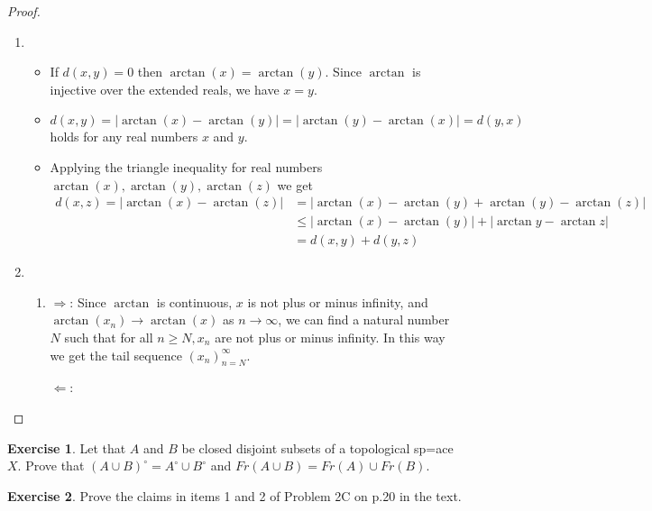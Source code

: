 \documentclass[12pt]{extarticle}
\newcommand{\abs}[1]{|#1|}
\newcommand{\<}{\langle}
\renewcommand{\>}{\rangle}
\theoremstyle{definition}
\newtheorem{exercise}{Exercise}
\begin{document}
\begin{proof}
  \begin{enumerate}
  \item
    \begin{itemize}
    \item
      If $d(x,y)=0$ then $\arctan(x) = \arctan(y)$. Since $\arctan$ is injective over the extended reals, we have $x=y$.
    \item
      $d(x,y) = \abs{\arctan(x) - \arctan(y)} = \abs{\arctan(y) - \arctan(x)} = d(y,x)$ holds for any real numbers $x$ and $y$.
    \item
      Applying the triangle inequality for real numbers $\arctan(x),\arctan(y),\arctan(z)$ we get
      \begin{align*}
        d(x,z) = \abs{\arctan(x) - \arctan(z)}
        &= \abs{\arctan(x) - \arctan(y) + \arctan(y) - \arctan(z)} \\
        &\leq  \abs{ \arctan(x) - \arctan(y)} + \abs{ \arctan{y} - \arctan{z}} \\
        &= d(x,y) + d(y,z)
      \end{align*}
    \end{itemize}
  \item
    \begin{enumerate}
    \item
      $\Rightarrow$: 
      Since $\arctan$ is continuous, $x$ is not plus or minus infinity, and $\arctan(x_n) \to \arctan(x)$ as $n \to \infty$, we can find a natural number $N$ such that for all $n \geq N, x_n$ are not plus or minus infinity. In this way we get the tail sequence $(x_n)_{n=N}^{\infty}$.   
      
      $\Leftarrow$: 

    \end{enumerate}


  \end{enumerate}
\end{proof}
\begin{exercise}
  Let that $A$ and $B$ be closed disjoint subsets of a topological sp=ace $X$. Prove that
  $(A \cup B)^\circ = A^\circ \cup B^ \circ$ and $ Fr(A \cup B) = Fr(A) \cup Fr(B)$. 
\end{exercise}

\begin{exercise}
  Prove the claims in items 1 and 2 of Problem 2C on p.20 in the text. 
\end{exercise}
\end{document}
